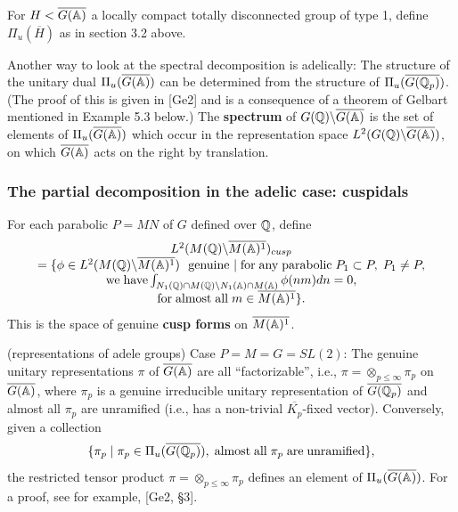 For $H<\overline{G({\Bbb{A}})}$ a locally
compact totally disconnected group of
type 1, define $\Pi_u(\overline{H})$ as in section 3.2 above.

Another way to look at the spectral decomposition
is adelically: The structure of the
unitary dual $\Pi_u(\overline{G({\Bbb{A}})})$ can be determined from the
structure of $\Pi_u(\overline{G({\Bbb{Q}}_p)})$.
(The proof of this is given in
[Ge2] and is a consequence of a theorem of Gelbart
mentioned in Example 5.3 below.) The {\bf
spectrum} of $G({\Bbb{Q}} )\backslash \overline{G({\Bbb{A}})}$ is the set of
elements of $\Pi_u(\overline{G({\Bbb{A}})})$
which occur in the representation
space $L^2(G({{\Bbb{Q}}} )\backslash \overline{G({\Bbb{A}})})$, on which
$\overline{G({\Bbb{A}})}$ acts on the right by translation.

\subsubsection{The partial decomposition in the adelic case: cuspidals}

For each parabolic $P=MN$ of $G$ defined over ${\Bbb{Q}}$, define 
\begin{equation}
\begin{array}{c}
L^2(M({\Bbb{Q}})\backslash \overline{M({\Bbb{A}})^1})_{cusp} \\ 
=\{\phi \in L^2(M({{\Bbb{Q}}})\backslash \overline{M({\Bbb{A}})^1})
\ {\rm \ genuine\ }|\;{\rm for\;any\;parabolic}\;
P_1\subset P,\;P_1\neq P, \\ 
{\rm we\;have}
\int_{N_1({\Bbb{Q}})\cap M({\Bbb{Q}})\backslash
N_1({\Bbb{A}})\cap M({\Bbb{A}})}\phi (nm)dn=0, \\ 
{\rm for\;almost\;all}\;m\in \overline{M({\Bbb{A}})^1}\}.
\end{array}
\end{equation}
This is the space of genuine {\bf cusp forms} on
$\overline{M({\Bbb{A}})^1}$.

\begin{example}
(representations of adele groups) {\sf Case} $P=M=G=SL(2)$:
The genuine unitary representations $\pi $ of
$\overline{G({{\Bbb{A}}})}$ are all
``factorizable'', i.e.,
$\pi =\otimes _{p\leq \infty}\pi _p$ on
$\overline{G({{\Bbb{A}}})}$, where
$\pi _p$ is a genuine irreducible unitary representation of
$\overline{G({\Bbb{Q}}_p)}$ and almost all $\pi _p$
are unramified (i.e., has a non-trivial
$\overline{K_p}$-fixed vector). Conversely, given a collection 
\[
\{\pi _p\;|\;\pi _p\in \Pi _u(\overline{G({\Bbb{Q}}_p)}),
\;{\rm almost\;all}\;\pi _p\;{\rm are\;unramified}\},
\]
the restricted tensor product
$\pi =\otimes _{p\leq \infty}\pi _p$
defines an element of $\Pi _u(\overline{G({\Bbb{A}})})$. For a proof,
see for example, [Ge2, \S 3].

\end{example}

